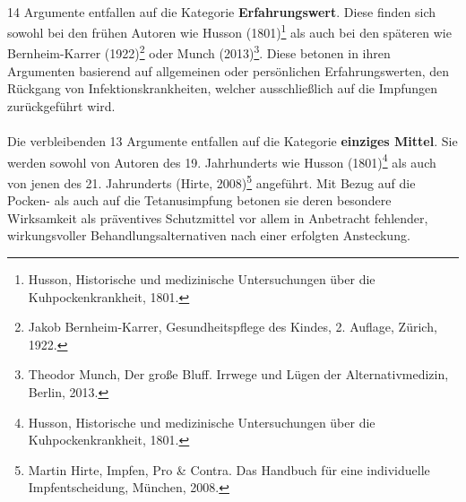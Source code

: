 \documentclass[
    a4paper,
    12pt,
    hyphens,
    chapterprefix=true,
    headheight=33pt,
    footheight=29pt,
    headings=optiontohead, %
]{scrartcl}
\begin{document}
{\\
14 Argumente entfallen auf die Kategorie \textbf{Erfahrungswert}. Diese finden sich sowohl bei den frühen Autoren wie Husson (1801)\footnote{Husson, Historische und medizinische Untersuchungen über die Kuhpockenkrankheit, 1801.} als auch bei den späteren wie 
Bernheim-Karrer (1922)\footnote{Jakob Bernheim-Karrer, Gesundheitspflege des Kindes, 2. Auflage, Zürich, 1922.} oder Munch (2013)\footnote{Theodor Munch, Der große Bluff. Irrwege und Lügen der Alternativmedizin, Berlin, 2013.}. Diese betonen in ihren Argumenten basierend auf allgemeinen oder persönlichen Erfahrungswerten, den Rückgang von Infektionskrankheiten, welcher ausschließlich auf die Impfungen zurückgeführt wird.\\
\\
Die verbleibenden 13 Argumente entfallen auf die Kategorie \textbf{einziges Mittel}. Sie werden sowohl von Autoren des 19. Jahrhunderts wie Husson (1801)\footnote{Husson, Historische und medizinische Untersuchungen über die Kuhpockenkrankheit, 1801.} als auch von jenen des 21. Jahrunderts (Hirte, 2008)\footnote{Martin Hirte, Impfen, Pro \& Contra. Das Handbuch für eine individuelle Impfentscheidung, München, 2008.} angeführt. Mit Bezug auf die Pocken- als auch auf die Tetanusimpfung betonen sie deren besondere Wirksamkeit als präventives Schutzmittel vor allem in Anbetracht fehlender, wirkungsvoller Behandlungsalternativen nach einer erfolgten Ansteckung.

}
\end{document}
